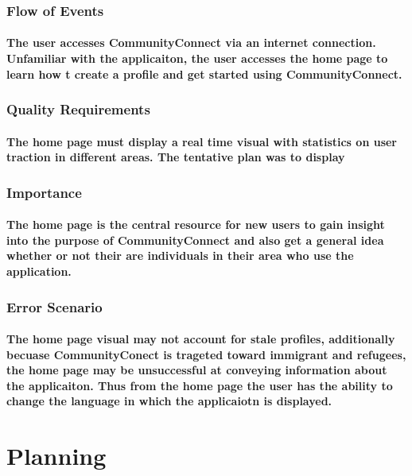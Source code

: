 \documentclass[12pt]{article}
\begin{document}
		\subsubsection{Flow of Events}
			\paragraph{\normalfont The user accesses CommunityConnect via an internet connection. Unfamiliar with the applicaiton, the user accesses the home page to learn how t create a profile and get started using CommunityConnect.
			}
		\subsubsection{Quality Requirements}
			\paragraph{\normalfont The home page must display a real time visual with statistics on user traction in different areas. The tentative plan was to display
			}
		\subsubsection{Importance}
			\paragraph{\normalfont The home page is the central resource for new users to gain insight into the purpose of CommunityConnect and also get a general idea whether or not their are individuals in their area who use the application.
			}
		\subsubsection{Error Scenario}
			\paragraph{\normalfont The home page visual may not account for stale profiles, additionally becuase CommunityConect is trageted toward immigrant and refugees, the home page may be unsuccessful at conveying information about the applicaiton. Thus from the home page the user has the ability to change the language in which the applicaiotn is displayed.
			}


\section{\bf Planning}
\end{document}
